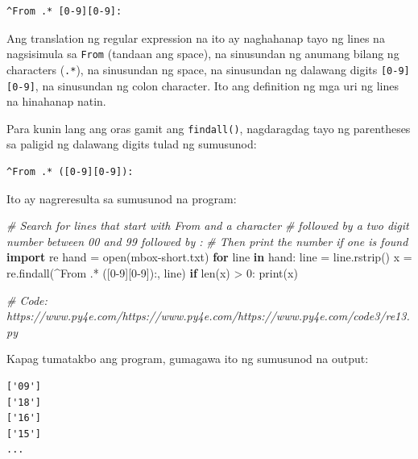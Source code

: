\documentclass[10pt,]{book}
\newenvironment{Shaded}{}{}
\newcommand{\BuiltInTok}[1]{\textcolor[rgb]{0.00,0.50,0.00}{#1}}
\newcommand{\CommentTok}[1]{\textcolor[rgb]{0.38,0.63,0.69}{\textit{#1}}}
\newcommand{\ControlFlowTok}[1]{\textcolor[rgb]{0.00,0.44,0.13}{\textbf{#1}}}
\newcommand{\DecValTok}[1]{\textcolor[rgb]{0.25,0.63,0.44}{#1}}
\newcommand{\ImportTok}[1]{\textcolor[rgb]{0.00,0.50,0.00}{\textbf{#1}}}
\newcommand{\KeywordTok}[1]{\textcolor[rgb]{0.00,0.44,0.13}{\textbf{#1}}}
\newcommand{\NormalTok}[1]{#1}
\newcommand{\OperatorTok}[1]{\textcolor[rgb]{0.40,0.40,0.40}{#1}}
\newcommand{\StringTok}[1]{\textcolor[rgb]{0.25,0.44,0.63}{#1}}
\begin{document}
{\small
\begin{verbatim}
^From .* [0-9][0-9]:
\end{verbatim}
}

Ang translation ng regular expression na ito ay naghahanap tayo ng lines
na nagsisimula sa \texttt{From} (tandaan ang space), na sinusundan ng
anumang bilang ng characters (\texttt{.*}), na sinusundan ng space, na
sinusundan ng dalawang digits \texttt{{[}0-9{]}{[}0-9{]}}, na sinusundan
ng colon character. Ito ang definition ng mga uri ng lines na hinahanap
natin.

Para kunin lang ang oras gamit ang \texttt{findall()}, nagdaragdag tayo
ng parentheses sa paligid ng dalawang digits tulad ng sumusunod:

{\small
\begin{verbatim}
^From .* ([0-9][0-9]):
\end{verbatim}
}

Ito ay nagreresulta sa sumusunod na program:

\begin{Shaded}
\begin{Highlighting}[]
\CommentTok{\# Search for lines that start with From and a character}
\CommentTok{\# followed by a two digit number between 00 and 99 followed by \textquotesingle{}:\textquotesingle{}}
\CommentTok{\# Then print the number if one is found}
\ImportTok{import}\NormalTok{ re}
\NormalTok{hand }\OperatorTok{=} \BuiltInTok{open}\NormalTok{(}\StringTok{\textquotesingle{}mbox{-}short.txt\textquotesingle{}}\NormalTok{)}
\ControlFlowTok{for}\NormalTok{ line }\KeywordTok{in}\NormalTok{ hand:}
\NormalTok{    line }\OperatorTok{=}\NormalTok{ line.rstrip()}
\NormalTok{    x }\OperatorTok{=}\NormalTok{ re.findall(}\StringTok{\textquotesingle{}\^{}From .* ([0{-}9][0{-}9]):\textquotesingle{}}\NormalTok{, line)}
    \ControlFlowTok{if} \BuiltInTok{len}\NormalTok{(x) }\OperatorTok{\textgreater{}} \DecValTok{0}\NormalTok{: }\BuiltInTok{print}\NormalTok{(x)}

\CommentTok{\# Code: https://www.py4e.com/https://www.py4e.com/https://www.py4e.com/code3/re13.py}
\end{Highlighting}
\end{Shaded}


Kapag tumatakbo ang program, gumagawa ito ng sumusunod na output:

{\small
\begin{verbatim}
['09']
['18']
['16']
['15']
...
\end{verbatim}
}
\end{document}
